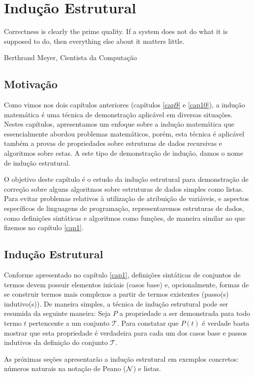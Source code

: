 \chapter{Indução Estrutural}\label{cap11}


\epigraph{Correctness is clearly the prime quality. If a system does
  not do what it is supposed to do, then everything else about it
  matters little.}{Berthrand Meyer, Cientista da Computação}

\section{Motivação}

Como vimos nos dois capítulos anteriores (capítulos \ref{cap9} e
\ref{cap10}), a indução matemática é uma técnica de demonstração
aplicável em diversas situações. Nestes capítulos, apresentamos um
enfoque sobre a indução matemática que essencialmente abordou
problemas matemáticos, porém, esta técnica é aplicável
também a provas de propriedades sobre estruturas de dados recursivas e
algoritmos sobre estas. A este tipo de demonstração de indução, damos
o nome de indução estrutural.

O objetivo deste capítulo é o estudo da indução estrutural para
demonstração de correção sobre alguns algoritmos sobre
estruturas de dados simples como listas. Para
evitar problemas relativos à utilização de atribuição de variáveis, e
aspectos específicos de linguagens de programação,
representaremos estruturas de dados, como definições sintáticas e
algoritmos como funções, de maneira similar ao que fizemos no capítulo
\ref{cap1}.

\section{Indução Estrutural}

Conforme apresentado no capítulo \ref{cap1}, definições sintáticas de
conjuntos de termos devem possuir elementos iniciais (casos base) e,
opcionalmente, formas de se construir termos mais complexos a
partir de termos existentes (passo(s) indutivo(s)).
De maneira simples, a técnica de indução estrutural pode ser resumida
da seguinte maneira: Seja $P$ a propriedade a ser demonstrada para
todo termo $t$ pertencente a um conjunto $\mathcal{T}$. Para constatar
que $P(t)$ é verdade basta mostrar que esta propriedade é verdadeira
para cada um dos casos base e passos indutivos da definição do
conjunto $\mathcal{T}$.

As próximas seções apresentarão a indução estrutural em exemplos
concretos: números naturais na notação de Peano ($\mathcal{N}$) e listas.

